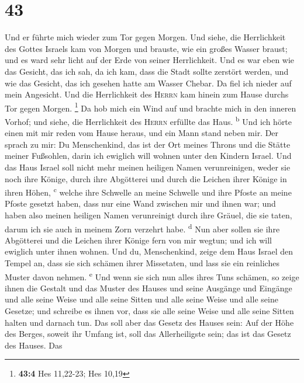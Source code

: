 \hypertarget{section-42}{%
\section{43}\label{section-42}}

 Und er führte mich wieder zum Tor gegen Morgen.
 Und siehe, die Herrlichkeit des Gottes Israels kam von
Morgen und brauste, wie ein großes Wasser braust; und es ward sehr licht
auf der Erde von seiner Herrlichkeit.  Und es war eben wie
das Gesicht, das ich sah, da ich kam, dass die Stadt sollte zerstört
werden, und wie das Gesicht, das ich gesehen hatte am Wasser Chebar. Da
fiel ich nieder auf mein Angesicht.  Und die Herrlichkeit
des \textsc{Herrn} kam hinein zum Hause durchs Tor gegen Morgen.
\footnote{\textbf{43:4} Hes 11,22-23; Hes 10,19}  Da hob
mich ein Wind auf und brachte mich in den inneren Vorhof; und siehe, die
Herrlichkeit des \textsc{Herrn} erfüllte das Haus. \textsuperscript{b}
 Und ich hörte einen mit mir reden vom Hause heraus, und
ein Mann stand neben mir.  Der sprach zu mir: Du
Menschenkind, das ist der Ort meines Throns und die Stätte meiner
Fußsohlen, darin ich ewiglich will wohnen unter den Kindern Israel. Und
das Haus Israel soll nicht mehr meinen heiligen Namen verunreinigen,
weder sie noch ihre Könige, durch ihre Abgötterei und durch die Leichen
ihrer Könige in ihren Höhen, \textsuperscript{c}  welche
ihre Schwelle an meine Schwelle und ihre Pfoste an meine Pfoste gesetzt
haben, dass nur eine Wand zwischen mir und ihnen war; und haben also
meinen heiligen Namen verunreinigt durch ihre Gräuel, die sie taten,
darum ich sie auch in meinem Zorn verzehrt habe. \textsuperscript{d}
 Nun aber sollen sie ihre Abgötterei und die Leichen ihrer
Könige fern von mir wegtun; und ich will ewiglich unter ihnen wohnen.
 Und du, Menschenkind, zeige dem Haus Israel den Tempel
an, dass sie sich schämen ihrer Missetaten, und lass sie ein reinliches
Muster davon nehmen. \textsuperscript{e}  Und wenn sie
sich nun alles ihres Tuns schämen, so zeige ihnen die Gestalt und das
Muster des Hauses und seine Ausgänge und Eingänge und alle seine Weise
und alle seine Sitten und alle seine Weise und alle seine Gesetze; und
schreibe es ihnen vor, dass sie alle seine Weise und alle seine Sitten
halten und darnach tun.  Das soll aber das Gesetz des
Hauses sein: Auf der Höhe des Berges, soweit ihr Umfang ist, soll das
Allerheiligste sein; das ist das Gesetz des Hauses.  Das
